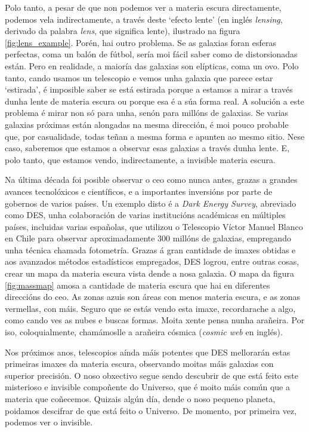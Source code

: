 \documentclass{article}
\begin{document}
Polo tanto, a pesar de que non podemos ver a materia escura directamente, podemos vela indirectamente, 
a través deste `efecto lente' (en inglés {\it lensing}, derivado da palabra {\it lens}, que significa 
lente), ilustrado na figura \ref{fig:lens_example}. Porén, hai outro problema. Se as galaxias foran esferas perfectas, coma un balón de fútbol, sería moi fácil saber como de distorsionadas están. Pero en realidade, a maioría das galaxias son elípticas, coma un ovo. Polo tanto, cando usamos un telescopio e 
vemos unha galaxia que parece estar `estirada', é imposible saber se está estirada porque a estamos a mirar a través 
dunha lente de materia escura ou porque esa é a súa forma real. A solución a este problema 
é mirar non só para unha, senón para millóns de galaxias. Se varias galaxias próximas están alongadas na mesma 
dirección, é moi pouco probable que, por casualidade, todas teñan a mesma forma e apunten ao mesmo sitio.
Nese caso, saberemos que estamos a observar esas galaxias a través dunha lente. E, polo tanto, que estamos vendo, indirectamente,  a invisible materia escura.

Na última década foi posible observar o ceo como nunca antes, grazas a grandes avances tecnolóxicos e 
científicos, e a importantes inversións por parte de gobernos de varios países. Un exemplo disto é a {\it Dark 
Energy Survey}, abreviado como DES, unha colaboración de varias institucións académicas en múltiples países, incluidas
varias españolas, que utilizou o Telescopio Víctor Manuel Blanco en Chile para observar aproximadamente 300 millóns de galaxias, empregando 
unha técnica chamada fotometría. Grazas á gran cantidade de imaxes obtidas e aos avanzados métodos estadísticos empregados, DES 
logrou, entre outras cosas, crear un mapa da materia escura vista dende a nosa galaxia. O mapa da figura
 \ref{fig:massmap} amosa a cantidade de materia escura que hai en diferentes direccións do ceo. As zonas azuis son áreas 
 con menos materia escura, e as zonas vermellas, con máis. Seguro que se estás vendo esta imaxe, recordarache a algo, 
 como cando ves as nubes e buscas formas. Moita xente pensa nunha arañeira. Por iso, coloquialmente, chamámoslle a 
 arañeira cósmica ({\it cosmic web} en inglés). 

Nos próximos anos, telescopios aínda máis potentes que DES mellorarán estas primeiras imaxes da materia escura, 
observando moitas máis galaxias con superior precisión. O noso obxectivo segue sendo descubrir de que está feito 
este misterioso e invisible compoñente do Universo, que é moito máis común que a materia que coñecemos. Quizais 
algún día, dende o noso pequeno planeta, poidamos descifrar de que está feito o Universo. De momento, por primeira 
vez, podemos ver o invisible. 
\end{document}
